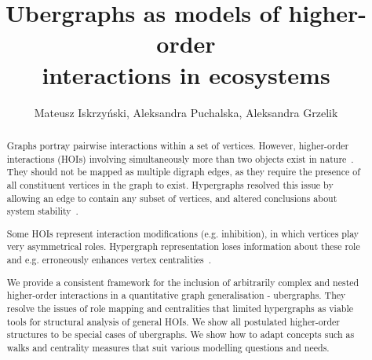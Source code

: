 \documentclass[a4paper,12pt]{article}
\title{Ubergraphs as models of higher-order \\
interactions in ecosystems}
\author{Mateusz Iskrzyński, Aleksandra Puchalska, Aleksandra Grzelik} %
\theoremstyle{definition}
\theoremstyle{remark}
\begin{document}
\maketitle

\begin{abstract}
Graphs portray pairwise interactions within a set of vertices. However, higher-order interactions (HOIs) involving simultaneously more than two objects exist in nature~\cite{GOLUBSKI2016344, Moleon_scavenging}. They should not be mapped as multiple digraph edges, as they require the presence of all constituent vertices in the graph to exist. Hypergraphs resolved this issue by allowing an edge to contain any subset of vertices, and altered conclusions about system stability~\cite{Grilli2017}. 

Some HOIs represent interaction modifications (e.g. inhibition), in which vertices play very asymmetrical roles. Hypergraph representation loses information about these role and e.g. erroneously enhances vertex centralities~\cite{GOLUBSKI2016344}.

We provide a consistent framework for the inclusion of arbitrarily complex and nested higher-order interactions in a quantitative graph generalisation - ubergraphs. They resolve the issues of role mapping and centralities that limited hypergraphs as viable tools for structural analysis of general HOIs. We show all postulated higher-order structures to be special cases of ubergraphs. We show how to adapt concepts such as walks and centrality measures that suit various modelling questions and needs.
\end{abstract}
\end{document}
